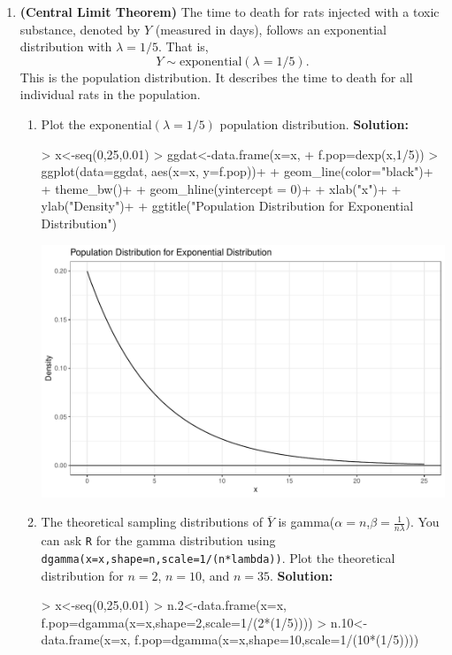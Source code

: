 \documentclass{article}
\begin{document}
\begin{enumerate}
\item \textbf{(Central Limit Theorem)} The time to death for rats injected with a toxic substance, denoted by $Y$
	(measured in days), follows an exponential distribution with $\lambda = 1/5$. That is,
	\[Y \sim \textrm{exponential}(\lambda = 1/5).\]
	This is the population distribution. It describes the time to death for all individual rats
	in the population.
	\begin{enumerate}
	  \item Plot the exponential$(\lambda = 1/5)$ population distribution.
	  \newline
	  \textbf{Solution:}
\begin{Schunk}
\begin{Sinput}
> x<-seq(0,25,0.01)
> ggdat<-data.frame(x=x,
+                   f.pop=dexp(x,1/5))
> ggplot(data=ggdat, aes(x=x, y=f.pop))+
+   geom_line(color="black")+
+   theme_bw()+
+   geom_hline(yintercept = 0)+
+   xlab("x")+
+   ylab("Density")+
+   ggtitle("Population Distribution for Exponential Distribution")
\end{Sinput}
\end{Schunk}
\includegraphics{HW2-025}
	  \item The theoretical sampling distributions of $\bar{Y}$ is gamma($\alpha=n$,$\beta=\frac{1}{n\lambda}$). 
	  You can ask \texttt{R} for the gamma distribution using \texttt{dgamma(x=x,shape=n,scale=1/(n*lambda))}.
	  Plot the theoretical distribution for $n=2$, $n=10$, and $n=35$.
	  \newline
	  \textbf{Solution:}
\begin{Schunk}
\begin{Sinput}
> x<-seq(0,25,0.01)
> n.2<-data.frame(x=x, f.pop=dgamma(x=x,shape=2,scale=1/(2*(1/5))))
> n.10<-data.frame(x=x, f.pop=dgamma(x=x,shape=10,scale=1/(10*(1/5))))

\end{Sinput}
\end{Schunk}
\end{enumerate}
\end{enumerate}
\end{document}
